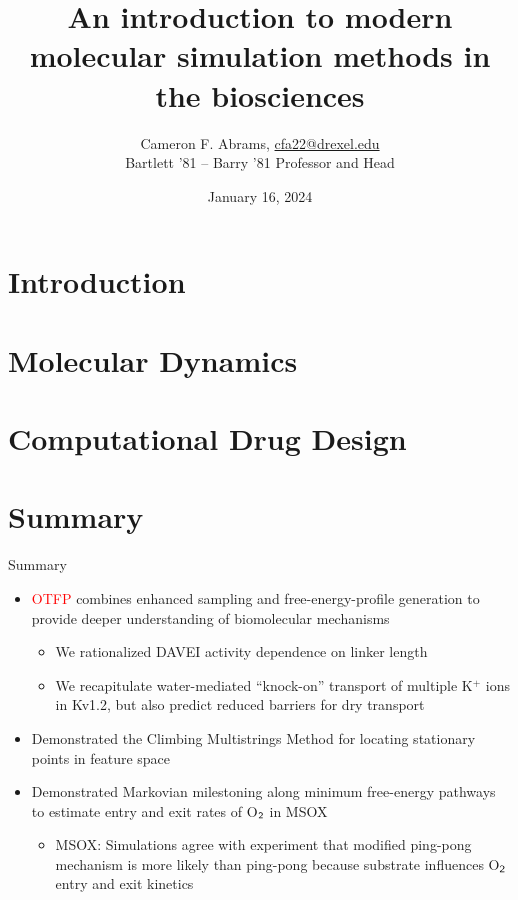 \documentclass[10pt]{beamer}
\title{An introduction to modern molecular simulation methods in the biosciences}
\date{January 16, 2024}
\author{Cameron F. Abrams, \href{mailto:cfa22@drexel.edu}{cfa22@drexel.edu}\\
Bartlett '81 -- Barry '81 Professor and Head }
\institute{Department of Chemical and Biological Engineering}
\begin{document}
\maketitle

\section{Introduction}





\section{Molecular Dynamics}







\section{Computational Drug Design}

\section{Summary}

\begin{frame}[fragile]{Summary}
\begin{itemize}
\item \textcolor{red}{OTFP} combines enhanced sampling and free-energy-profile generation to provide deeper understanding of biomolecular mechanisms
\begin{itemize}
\item We rationalized DAVEI activity dependence on linker length
\item We recapitulate water-mediated ``knock-on'' transport of multiple K$^+$ ions in Kv1.2, but also predict reduced barriers for dry transport
\end{itemize}
\item Demonstrated the \textcolor{magenta!80!black}{Climbing Multistrings Method} for locating stationary points in feature space
\item Demonstrated \textcolor{green!80!black}{Markovian milestoning} along minimum free-energy pathways to estimate entry and exit rates of O$_{\sf 2}$ in MSOX
\begin{itemize}
\item MSOX: Simulations agree with experiment that modified ping-pong mechanism is more likely than ping-pong because substrate influences O$_{\sf 2}$
entry and exit kinetics
\end{itemize}
\end{itemize}
\end{frame}

% 
\end{document}
